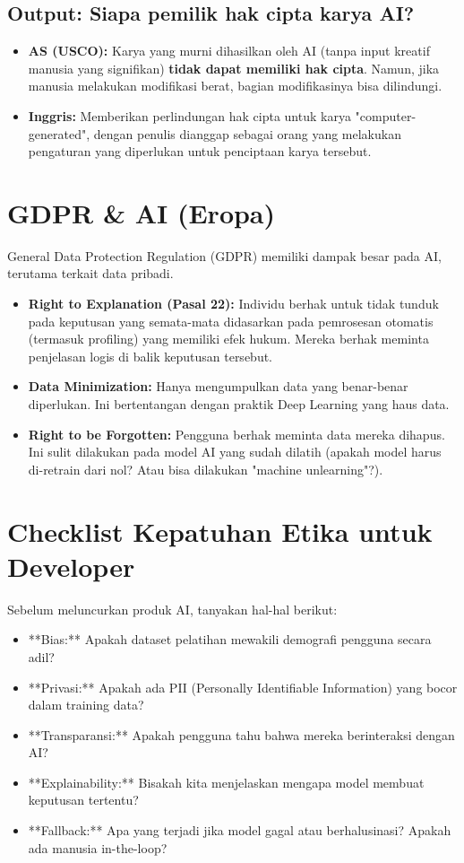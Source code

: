 \subsection{Output: Siapa pemilik hak cipta karya AI?}
\begin{itemize}
    \item \textbf{AS (USCO):} Karya yang murni dihasilkan oleh AI (tanpa input kreatif manusia yang signifikan) \textbf{tidak dapat memiliki hak cipta}. Namun, jika manusia melakukan modifikasi berat, bagian modifikasinya bisa dilindungi.
    \item \textbf{Inggris:} Memberikan perlindungan hak cipta untuk karya "computer-generated", dengan penulis dianggap sebagai orang yang melakukan pengaturan yang diperlukan untuk penciptaan karya tersebut.
\end{itemize}

\section{GDPR & AI (Eropa)}
General Data Protection Regulation (GDPR) memiliki dampak besar pada AI, terutama terkait data pribadi.

\begin{itemize}
    \item \textbf{Right to Explanation (Pasal 22):} Individu berhak untuk tidak tunduk pada keputusan yang semata-mata didasarkan pada pemrosesan otomatis (termasuk profiling) yang memiliki efek hukum. Mereka berhak meminta penjelasan logis di balik keputusan tersebut.
    \item \textbf{Data Minimization:} Hanya mengumpulkan data yang benar-benar diperlukan. Ini bertentangan dengan praktik Deep Learning yang haus data.
    \item \textbf{Right to be Forgotten:} Pengguna berhak meminta data mereka dihapus. Ini sulit dilakukan pada model AI yang sudah dilatih (apakah model harus di-retrain dari nol? Atau bisa dilakukan "machine unlearning"?).
\end{itemize}

\section{Checklist Kepatuhan Etika untuk Developer}

Sebelum meluncurkan produk AI, tanyakan hal-hal berikut:
\begin{itemize}
    \item [ ] **Bias:** Apakah dataset pelatihan mewakili demografi pengguna secara adil?
    \item [ ] **Privasi:** Apakah ada PII (Personally Identifiable Information) yang bocor dalam training data?
    \item [ ] **Transparansi:** Apakah pengguna tahu bahwa mereka berinteraksi dengan AI?
    \item [ ] **Explainability:** Bisakah kita menjelaskan mengapa model membuat keputusan tertentu?
    \item [ ] **Fallback:** Apa yang terjadi jika model gagal atau berhalusinasi? Apakah ada manusia in-the-loop?
\end{itemize}
